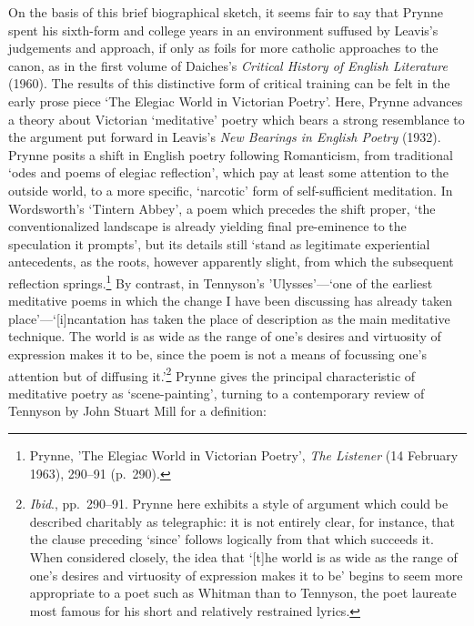 \documentclass[]{article}
\begin{document}
On the basis of this brief biographical sketch, it seems fair to say
that Prynne spent his sixth-form and college years in an environment
suffused by Leavis’s judgements and approach, if only as foils for more
catholic approaches to the canon, as in the first volume of Daiches’s
\emph{Critical History of English Literature} (1960). The results of
this distinctive form of critical training can be felt in the early
prose piece ‘The Elegiac World in Victorian Poetry’. Here, Prynne
advances a theory about Victorian ‘meditative’ poetry which bears a
strong resemblance to the argument put forward in Leavis’s \emph{New
Bearings in English Poetry} (1932). Prynne posits a shift in English
poetry following Romanticism, from traditional ‘odes and poems of
elegiac reflection’, which pay at least some attention to the outside
world, to a more specific, ‘narcotic’ form of self-sufficient
meditation. In Wordsworth’s ‘Tintern Abbey’, a poem which precedes the
shift proper, ‘the conventionalized landscape is already yielding final
pre-eminence to the speculation it prompts’, but its details still
‘stand as legitimate experiential antecedents, as the roots, however
apparently slight, from which the subsequent reflection
springs.\footnote{Prynne, ’The Elegiac World in Victorian Poetry’,
  \emph{The Listener} (14 February 1963), 290–91 (p.~290).} By contrast,
in Tennyson’s ’Ulysses’—‘one of the earliest meditative poems in which
the change I have been discussing has already taken
place’—‘{[}i{]}ncantation has taken the place of description as the main
meditative technique. The world is as wide as the range of one’s desires
and virtuosity of expression makes it to be, since the poem is not a
means of focussing one’s attention but of diffusing it.’\footnote{\emph{Ibid}.,
  pp.~290–91. Prynne here exhibits a style of argument which could be
  described charitably as telegraphic: it is not entirely clear, for
  instance, that the clause preceding ‘since’ follows logically from
  that which succeeds it. When considered closely, the idea that
  ‘{[}t{]}he world is as wide as the range of one’s desires and
  virtuosity of expression makes it to be’ begins to seem more
  appropriate to a poet such as Whitman than to Tennyson, the poet
  laureate most famous for his short and relatively restrained lyrics.}
Prynne gives the principal characteristic of meditative poetry as
‘scene-painting’, turning to a contemporary review of Tennyson by John
Stuart Mill for a definition:
\end{document}
